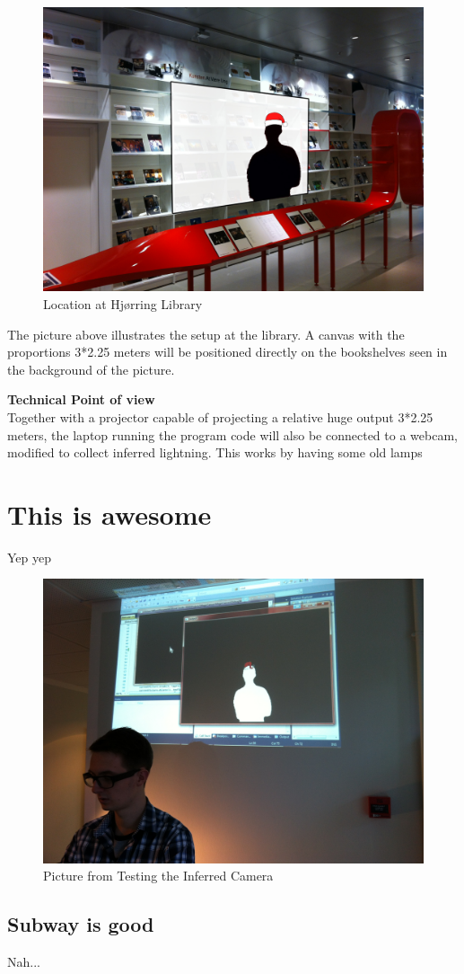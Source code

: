 \begin{figure}[htbp]
\centering
\includegraphics[width=1.00\textwidth]{Pictures/HjoerringLibrary/LocationJohannesHat.jpg}
\caption{Location at Hjørring Library}
\label{fig:Location at Hjørring Library}
\end{figure}

The picture above illustrates the setup at the library. A canvas with the proportions 3*2.25 meters will be positioned directly on the bookshelves seen in the background of the picture.

\textbf{Technical Point of view}\\
Together with a projector capable of projecting a relative huge output 3*2.25 meters, the laptop running the program code will also be connected to a webcam, modified to collect inferred lightning. This works by having some old lamps 


     


\section{This is awesome}
Yep yep

\begin{figure}[htbp]
\centering
\includegraphics[width=1.00\textwidth]{Pictures/Test/IMG_1477.jpg}
\caption{Picture from Testing the Inferred Camera}
\label{fig:Picture from Testing the Inferred Camera}
\end{figure}

\subsection{Subway is good}
Nah...